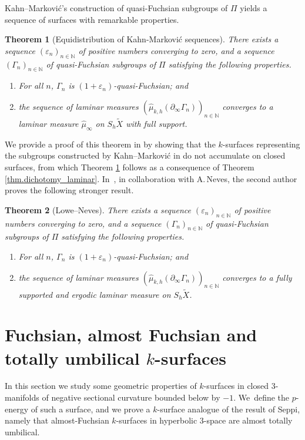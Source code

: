 \documentclass[10pt]{amsart}
\newcommand{\ksurface}{$k$\nobreakdash-surface\xspace}
\newcommand{\ksurfaces}{$k$\nobreakdash-surfaces\xspace}
\theoremstyle{plain}
\newtheorem{theorem}{Theorem}[section]
\theoremstyle{definition}
\let\eps\varepsilon
\newcommand{\bord}{\partial_{\infty}}
\begin{document}
Kahn--Markovi\'c's construction \cite{KM1} of quasi-Fuchsian subgroups of $\Pi$ yields a sequence of surfaces with remarkable properties.

\begin{theorem}[Equidistribution of Kahn-Markovi\'c sequences]\label{KM_equidistrib}
There exists a sequence $(\eps_n)_{n\in\mathbb{N}}$ of positive numbers converging to zero, and a sequence $(\Gamma_n)_{n\in\mathbb{N}}$ of quasi-Fuchsian subgroups of $\Pi$ satisfying the following properties.
\begin{enumerate}
\item For all $n$, $\Gamma_n$ is $(1+\eps_n)$-quasi-Fuchsian; and
\item the sequence of laminar measures $(\hat \mu_{k,h}(\bord\Gamma_n))_{n\in\mathbb{N}}$ converges to a laminar measure $\hat \mu_\infty$ on $S_h\tilde{X}$ with full support.
\end{enumerate}
\end{theorem}

We provide a proof of this theorem in \cite{ALS} by showing that the \ksurfaces representing the subgroups constructed by Kahn--Markovi\'c in \cite{KM1} do not accumulate on closed surfaces, from which Theorem \ref{KM_equidistrib} follows as a consequence of Theorem \ref{thm.dichotomy_laminar}. In~\cite[Prop.\,6.1]{ln21}, in collaboration with A.\,Neves, the second author proves the following stronger result.

\begin{theorem}[Lowe--Neves]\label{th.lowe_neves}
There exists a sequence $(\eps_n)_{n\in\mathbb{N}}$ of positive numbers converging to zero, and a sequence $(\Gamma_n)_{n\in\mathbb{N}}$ of quasi-Fuchsian subgroups of $\Pi$ satisfying the following properties.
\begin{enumerate}
\item For all $n$, $\Gamma_n$ is $(1+\eps_n)$-quasi-Fuchsian; and
\item the sequence of laminar measures $(\hat \mu_{k,h}(\bord\Gamma_n))_{n\in\mathbb{N}}$ converges to a fully supported and ergodic laminar measure on $S_h\tilde{X}$.
\end{enumerate}
\end{theorem}

\section{Fuchsian, almost Fuchsian and totally umbilical \texorpdfstring{\protect\ksurfaces}{ksurf}} In this section we study some geometric properties of \ksurfaces in closed $3$\nobreakdash-manifolds of negative sectional curvature bounded below by $-1$. We~define the $p$-energy of such a surface, and we prove a \ksurface analogue of the result \cite{Seppi} of Seppi, namely that almost-Fuchsian \ksurfaces in hyperbolic $3$\nobreakdash-space are almost totally umbilical.
\end{document}
